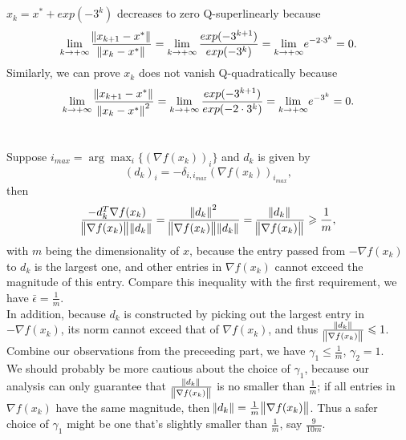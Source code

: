 \documentclass[11pt]{article}
\begin{document}
\maketitle
\section{}
$x_k=x^*+exp(-3^k)$ decreases to zero Q-superlinearly because $$\lim_{k\to+\infty}\frac{\norm{x_{k+1}-x^*}}{\norm{x_{k}-x^*}}=\lim_{k\to+\infty}\frac{exp(-3^{k+1})}{exp(-3^{k})}={\lim_{k\to+\infty}}e^{-2\cdot 3^k}=0.$$ Similarly, we can prove ${x_k}$ does not vanish Q-quadratically because $$\lim_{k\to+\infty}\frac{\norm{x_{k+1}-x^*}}{\norm{x_{k}-x^*}^2}=\lim_{k\to+\infty}\frac{exp(-3^{k+1})}{exp(-2\cdot3^{k})}={\lim_{k\to+\infty}}e^{-3^k}=0.$$

\section{}
Suppose $i_{max}=\arg\max_{i}\{(\nabla f(x_k))_i\}$ and $d_k$ is given by $$(d_k)_i=-\delta_{i,i_{max}}(\nabla f(x_k))_{i_{max}},$$ then $$\frac{-d_k^T\nabla f(x_k)}{\norm{\nabla f(x_k)}\norm{d_k}}=\frac{\norm{d_k}^2}{\norm{\nabla f(x_k)}\norm{d_k}}=\frac{\norm{d_k}}{\norm{\nabla f(x_k)}}\geqslant\frac1m, $$ with $m$ being the dimensionality of $x$, because the entry passed from $-\nabla f(x_k)$ to $d_k$ is the largest one, and other entries in $\nabla f(x_k)$ cannot exceed the magnitude of this entry. Compare this inequality with the first requirement, we have $\bar{\epsilon}=\frac1m$.\\[0.5cm]
In addition, because $d_k$ is constructed by picking out the largest entry in $-\nabla f(x_k)$, its norm cannot exceed that of $\nabla f(x_k)$, and thus $\frac{\norm{d_k}}{\norm{\nabla f(x_k)}}\leqslant1$. Combine our observations from the preceeding part, we have $\gamma_1\leqslant\frac1m$, $\gamma_2=1$.\\[0.5cm]
We should probably be more cautious about the choice of $\gamma_1$, because our analysis can only guarantee that $\frac{\norm{d_k}}{\norm{\nabla f(x_k)}}$ is no smaller than $\frac1m$; if all entries in $\nabla f(x_k)$ have the same magnitude, then $\norm{d_k}=\frac1m\norm{\nabla f(x_k)}$. Thus a safer choice of $\gamma_1$ might be one that's slightly smaller than $\frac1m$, say $\frac9{10m}$. 
\end{document}
